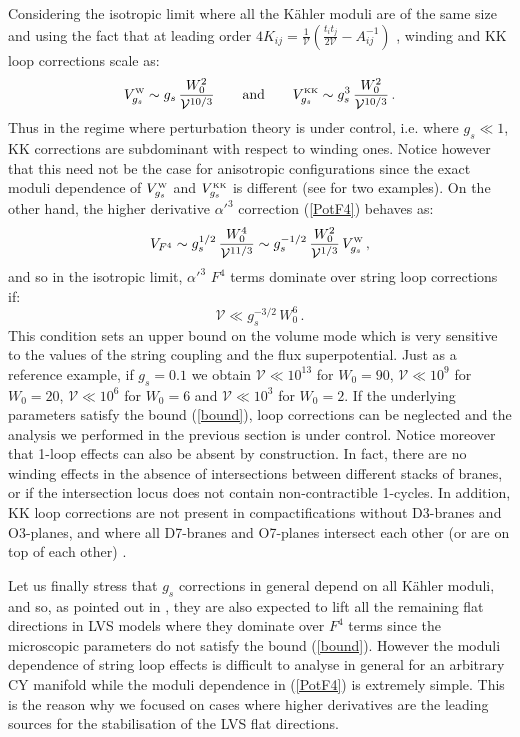 \documentclass[11pt,a4paper]{article}
\newcommand{\be}{\begin{equation}}
\newcommand{\ee}{\end{equation}}
\def\KK{{\scriptscriptstyle \rm KK}}
\def\W{{\scriptscriptstyle \rm W}}
\newcommand\vo{{\mathcal{V}}}
\begin{document}
Considering the isotropic limit where all the K\"ahler moduli are of the same size and using the fact that at leading order $4 K_{ij} = \frac{1}{\vo} \left(\frac{t_i t_j}{2 \vo}- A_{ij}^{-1} \right)$ \cite{Berg:2007wt, Cicoli:2007xp}, winding and KK loop corrections scale as:
\be
V_{g_s}^\W \sim g_s \,\frac{W_0^2}{\vo^{10/3}}\qquad\text{and}\qquad V_{g_s}^\KK \sim g_s^3 \,\frac{W_0^2}{\vo^{10/3}}\,.
\ee
Thus in the regime where perturbation theory is under control, i.e. where $g_s\ll 1$, KK corrections are subdominant with respect to winding ones. Notice however that this need not be the case for anisotropic configurations since the exact moduli dependence of $V_{g_s}^\W$ and $V_{g_s}^\KK$ is different (see \cite{Cicoli:2008gp, Cicoli:2011yy} for two examples). On the other hand, the higher derivative $\alpha'^3$ correction (\ref{PotF4}) behaves as:
\be
V_{F^4}\sim g_s^{1/2}\,\frac{W_0^4}{\vo^{11/3}}\sim g_s^{-1/2}\,\frac{W_0^2}{\vo^{1/3}}\,V_{g_s}^\W \,,
\label{eq:V_1est}
\ee 
and so in the isotropic limit, $\alpha'^3$ $F^4$ terms dominate over string loop corrections if:
\be
\vo \ll g_s^{-3/2}\,W_0^6\,.
\label{bound}
\ee
This condition sets an upper bound on the volume mode which is very sensitive to the values of the string coupling and the flux superpotential. Just as a reference example, if $g_s=0.1$ we obtain $\vo\ll 10^{13}$ for $W_0=90$, $\vo\ll 10^9$ for $W_0=20$, $\vo\ll 10^6$ for $W_0=6$ and $\vo\ll 10^3$ for $W_0=2$. If the underlying parameters satisfy the bound (\ref{bound}), loop corrections can be neglected and the analysis we performed in the previous section is under control. Notice moreover that 1-loop effects can also be absent by construction. In fact, there are no winding effects in the absence of intersections between different stacks of branes, or if the intersection locus does not contain non-contractible 1-cycles. In addition, KK loop corrections are not present in compactifications without D3-branes and O3-planes, and where all D7-branes and O7-planes intersect each other (or are on top of each other) \cite{Berg:2007wt}.

Let us finally stress that $g_s$ corrections in general depend on all K\"ahler moduli, and so, as pointed out in \cite{Cicoli:2008va}, they are also expected to lift all the remaining flat directions in LVS models where they dominate over $F^4$ terms since the microscopic parameters do not satisfy the bound (\ref{bound}). However the moduli dependence of string loop effects is difficult to analyse in general for an arbitrary CY manifold while the moduli dependence in (\ref{PotF4}) is extremely simple. This is the reason why we focused on cases where higher derivatives are the leading sources for the stabilisation of the LVS flat directions. 
\end{document}
